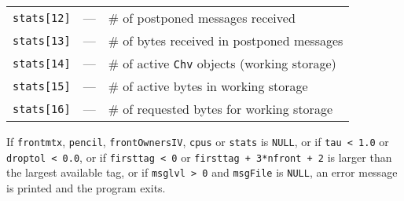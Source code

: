 \begin{enumerate}
\begin{center}
\begin{tabular}{ccl}
{\tt stats[12]} & --- & \# of postponed messages received \\
{\tt stats[13]} & --- & \# of bytes received in postponed messages \\
{\tt stats[14]} & --- & \# of active {\tt Chv} objects (working storage) \\
{\tt stats[15]} & --- & \# of active bytes in working storage \\
{\tt stats[16]} & --- & \# of requested bytes for working storage
\end{tabular}
\end{center}
\par {}
If {\tt frontmtx}, {\tt pencil}, {\tt frontOwnersIV}, {\tt cpus}
or {\tt stats} is {\tt NULL}, 
or if {\tt tau < 1.0} or {\tt droptol < 0.0},
or if {\tt firsttag < 0} or {\tt firsttag + 3*nfront + 2} 
is larger than the largest available tag,
or if {\tt msglvl > 0} and {\tt msgFile} is {\tt NULL},
an error message is printed and the program exits.
\end{enumerate}
\par
